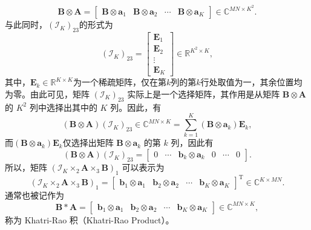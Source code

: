 \[
    \mathbf{B} \otimes \mathbf{A} = \begin{bmatrix}
        \mathbf{B} \otimes \bm{a}_1 & \mathbf{B} \otimes \bm{a}_2 & \cdots & \mathbf{B} \otimes \bm{a}_K
    \end{bmatrix} \in \mathbb{C}^{M N \times K^2}.
\]
与此同时，\( (\mathcal{I}_K)_{23} \)的形式为
\[
    (\mathcal{I}_K)_{23} = \begin{bmatrix}
        \mathbf{E}_1  \\ \mathbf{E}_2  \\ \vdots \\ \mathbf{E}_K
    \end{bmatrix} \in \mathbb{R}^{K^2 \times K},
\]
其中，\( \mathbf{E}_k \in \mathbb{R}^{K \times K} \)为一个稀疏矩阵，仅在第\( k \)列的第\( k \)行处取值为一，其余位置均为零。由此可见，矩阵 \( (\mathcal{I}_K)_{23} \) 实际上是一个选择矩阵，其作用是从矩阵 \( \mathbf{B} \otimes \mathbf{A} \) 的 \( K^2 \) 列中选择出其中的 \( K \) 列。因此，有
\[
    (\mathbf{B} \otimes \mathbf{A}) (\mathcal{I}_K)_{23} \in \mathbb{C}^{M N \times K} = \sum_{k=1}^K (\mathbf{B} \otimes \bm{a}_k) \mathbf{E}_k,
\]
而\( (\mathbf{B} \otimes \bm{a}_k) \mathbf{E}_k \)仅选择出矩阵 \( \mathbf{B} \otimes \bm{a}_k \) 的第 \( k \) 列，因此有
\[
    (\mathbf{B} \otimes \mathbf{A}) (\mathcal{I}_K)_{23} = \begin{bmatrix}
        0 & \cdots& \bm{b}_k \otimes \bm{a}_k & 0 & \cdots & 0
    \end{bmatrix}.
\]
所以，矩阵 \( (\mathcal{I}_K \times_2 \mathbf{A} \times_3 \mathbf{B})_{1} \) 可以表示为
\[
    (\mathcal{I}_K \times_2 \mathbf{A} \times_3 \mathbf{B})_{1} = \begin{bmatrix}
        \bm{b}_1 \otimes \bm{a}_1 & \bm{b}_2 \otimes \bm{a}_2 & \cdots & \bm{b}_K \otimes \bm{a}_K
    \end{bmatrix}^{\mathrm{T}} \in \mathbb{C}^{K \times M N}.
\]
通常也被记作为
\[
    \mathbf{B} \ast  \mathbf{A} = \begin{bmatrix}
        \bm{b}_1 \otimes \bm{a}_1 & \bm{b}_2 \otimes \bm{a}_2 & \cdots & \bm{b}_K \otimes \bm{a}_K
    \end{bmatrix} \in \mathbb{C}^{M N \times K},
\]
称为 Khatri-Rao 积（Khatri-Rao Product）。

